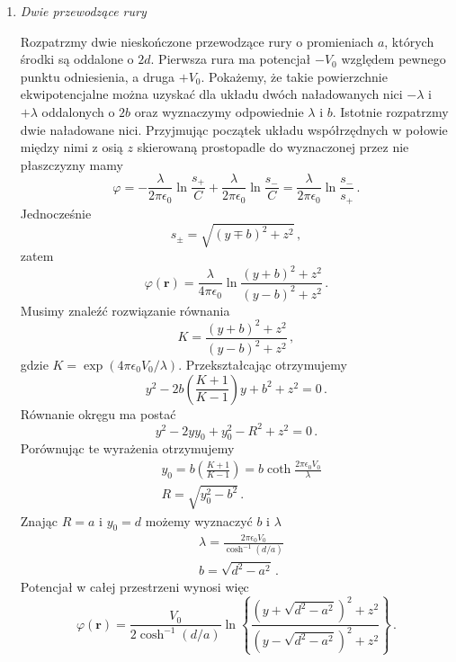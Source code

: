 \documentclass[../main.tex]{subfiles}
\begin{document}
\begin{enumerate}
    \item\textit{Dwie przewodzące rury}
    \medskip
    
    Rozpatrzmy dwie nieskończone przewodzące rury o promieniach \(a\), których środki są oddalone o \(2d\). Pierwsza rura ma potencjał \(-V_0\) względem pewnego punktu odniesienia, a druga \(+V_0\). Pokażemy, że takie powierzchnie ekwipotencjalne można uzyskać dla układu dwóch naładowanych nici \(-\lambda\) i \(+\lambda\) oddalonych o \(2b\) oraz wyznaczymy odpowiednie \(\lambda\) i \(b\). Istotnie rozpatrzmy dwie naładowane nici. Przyjmując początek układu współrzędnych w połowie między nimi z osią \(z\) skierowaną prostopadle do wyznaczonej przez nie płaszczyzny mamy
    \begin{equation*}
        \varphi=-\frac{\lambda}{2\pi\epsilon_0}\ln\frac{s_+}{C}+\frac{\lambda}{2\pi\epsilon_0}\ln\frac{s_-}{C}=\frac{\lambda}{2\pi\epsilon_0}\ln\frac{s_-}{s_+}\,.
    \end{equation*}
    Jednocześnie
    \begin{equation*}
        s_\pm=\sqrt{(y\mp b)^2+z^2}\,,
    \end{equation*}
    zatem
    \begin{equation*}
        \varphi(\mathbf{r})=\frac{\lambda}{4\pi\epsilon_0}\ln\frac{(y+b)^2+z^2}{(y-b)^2+z^2}\,.
    \end{equation*}
    Musimy znaleźć rozwiązanie równania
    \begin{equation*}
        K=\frac{(y+b)^2+z^2}{(y-b)^2+z^2}\,,
    \end{equation*}
    gdzie \(K=\exp(4\pi\epsilon_0V_0/\lambda)\). Przekształcając otrzymujemy
    \begin{equation*}
        y^2-2b\left(\frac{K+1}{K-1}\right)y+b^2+z^2=0\,.
    \end{equation*}
    Równanie okręgu ma postać
    \begin{equation*}
        y^2-2yy_0+y_0^2-R^2+z^2=0\,.
    \end{equation*}
    Porównując te wyrażenia otrzymujemy
    \begin{equation*}
        \begin{split}
            &y_0=b\left(\frac{K+1}{K-1}\right)=b\coth\frac{2\pi\epsilon_0V_0}{\lambda}\\
            &R=\sqrt{y_0^2-b^2}\,.
        \end{split}
    \end{equation*}
    Znając \(R=a\) i \(y_0=d\) możemy wyznaczyć \(b\) i \(\lambda\)
    \begin{equation*}
    \begin{split}
        &\lambda=\frac{2\pi\epsilon_0V_0}{\cosh^{-1}{(d/a)}}\\
        &b=\sqrt{d^2-a^2}\,.
    \end{split}
    \end{equation*}
    Potencjał w całej przestrzeni wynosi więc
    \begin{equation*}
        \varphi(\mathbf{r})=\frac{V_0}{2\cosh^{-1}(d/a)}\ln\left\{\frac{(y+\sqrt{d^2-a^2})^2+z^2}{(y-\sqrt{d^2-a^2})^2+z^2}\right\}\,.
    \end{equation*}
    

\end{enumerate}
\end{document}
